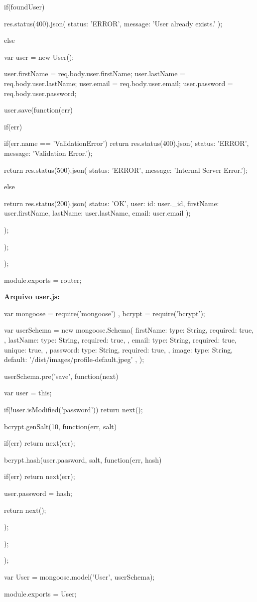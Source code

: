 \begin{flushleft}
{{		if(foundUser) {
			res.status(400).json({ status: 'ERROR', message: 'User already exists.' });
			
		} else {
		
		var user = new User();
		
		user.firstName = req.body.user.firstName;
		user.lastName = req.body.user.lastName;
		user.email = req.body.user.email;
		user.password = req.body.user.password;
		
		user.save(function(err) {
			if(err) {
				if(err.name == 'ValidationError')
				return res.status(400).json({ status: 'ERROR', message: 'Validation Error.'});
				
				return res.status(500).json({ status: 'ERROR', message: 'Internal Server Error.'});
			}
			else {
				return res.status(200).json({ 
					status: 'OK', 
					user: {
						id: user.\_id,
						firstName: user.firstName,
						lastName: user.lastName,
						email: user.email
					}
				});
				
			}
			
		});
		
	}
	
});
});

module.exports = router;


\textbf{Arquivo user.js:}

var mongoose = require('mongoose')
, bcrypt = require('bcrypt');

var userSchema = new mongoose.Schema({
	firstName: {
		type: String,
		required: true,
	},
	lastName: {
		type: String,
		required: true,
	},
	email: {
		type: String,
		required: true,
		unique: true,
	},
	password: {
		type: String,
		required: true,
	},
	image: {
		type: String,
		default: '/dist/images/profile-default.jpeg'
	},
});

userSchema.pre('save', function(next) {
	var user = this;
	
	if(!user.isModified('password'))
	return next();
	
	bcrypt.genSalt(10, function(err, salt) {
		if(err)
		return next(err);
		
		bcrypt.hash(user.password, salt, function(err, hash) {
			if(err)
			return next(err);
			
			user.password = hash;
			
			return next();
		});
	});
});

var User = mongoose.model('User', userSchema);

module.exports = User;


\end{flushleft}
